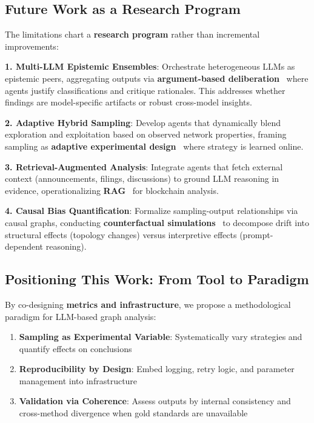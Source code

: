 \subsection{Future Work as a Research Program}

The limitations chart a \textbf{research program} rather than incremental improvements:

\textbf{1. Multi-LLM Epistemic Ensembles}: Orchestrate heterogeneous LLMs as epistemic peers, aggregating outputs via \textbf{argument-based deliberation}~\cite{prakken2018} where agents justify classifications and critique rationales. This addresses whether findings are model-specific artifacts or robust cross-model insights.

\textbf{2. Adaptive Hybrid Sampling}: Develop agents that dynamically blend exploration and exploitation based on observed network properties, framing sampling as \textbf{adaptive experimental design}~\cite{murphy2005active} where strategy is learned online.

\textbf{3. Retrieval-Augmented Analysis}: Integrate agents that fetch external context (announcements, filings, discussions) to ground LLM reasoning in evidence, operationalizing \textbf{RAG}~\cite{lewis2020rag} for blockchain analysis.

\textbf{4. Causal Bias Quantification}: Formalize sampling-output relationships via causal graphs, conducting \textbf{counterfactual simulations}~\cite{pearl2009causality} to decompose drift into structural effects (topology changes) versus interpretive effects (prompt-dependent reasoning).

\subsection{Positioning This Work: From Tool to Paradigm}

By co-designing \textbf{metrics and infrastructure}, we propose a methodological paradigm for LLM-based graph analysis:
\begin{enumerate}
    \item \textbf{Sampling as Experimental Variable}: Systematically vary strategies and quantify effects on conclusions
    \item \textbf{Reproducibility by Design}: Embed logging, retry logic, and parameter management into infrastructure
    \item \textbf{Validation via Coherence}: Assess outputs by internal consistency and cross-method divergence when gold standards are unavailable
\end{enumerate}

